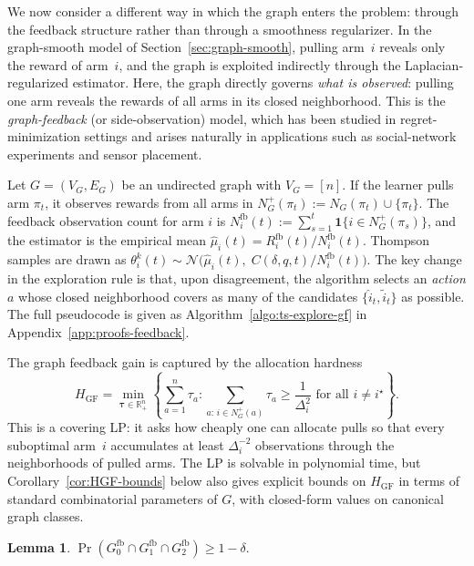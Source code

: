 \documentclass{article}
\newcommand{\ind}{\mathbf{1}}         %
\newtheorem{lemma}[theorem]{Lemma}
\begin{document}
We now consider a different way in which the graph enters the problem: through the feedback structure rather than through a smoothness regularizer.
In the graph-smooth model of Section~\ref{sec:graph-smooth}, pulling arm~$i$ reveals only the reward of arm~$i$, and the graph is exploited indirectly through the Laplacian-regularized estimator.
Here, the graph directly governs \emph{what is observed}: pulling one arm reveals the rewards of all arms in its closed neighborhood. This is the \emph{graph-feedback} (or side-observation) model, which has been studied in regret-minimization settings \citep{atsidakou2022asymptotically, wu2015online} and arises naturally in applications such as social-network experiments and sensor placement.

Let $G=(V_G,E_G)$ be an undirected graph with $V_G=[n]$. If the learner pulls arm $\pi_t$, it observes rewards from all arms in $N_G^+(\pi_t) := N_G(\pi_t) \cup \{\pi_t\}$. The feedback observation count for arm $i$ is $N_i^{\mathrm{fb}}(t) := \sum_{s=1}^t \ind\{i\in N_G^+(\pi_s)\}$, and the estimator is the empirical mean $\widehat\mu_i(t) = R_i^{\mathrm{fb}}(t)/N_i^{\mathrm{fb}}(t)$. Thompson samples are drawn as $\theta_i^k(t)\sim \mathcal N\bigl(\widehat\mu_i(t),\;C(\delta,q,t)/N_i^{\mathrm{fb}}(t)\bigr)$. The key change in the exploration rule is that, upon disagreement, the algorithm selects an \emph{action} $a$ whose closed neighborhood covers as many of the candidates $\{\widehat i_t, \widetilde i_t\}$ as possible. The full pseudocode is given as Algorithm~\ref{algo:ts-explore-gf} in Appendix~\ref{app:proofs-feedback}.

The graph feedback gain is captured by the allocation hardness
\begin{equation}
H_{\mathrm{GF}}
=
\min_{\bm\tau\in\mathbb R_+^n}
\left\{
\sum_{a=1}^n \tau_a:
\sum_{a:\,i\in N_G^+(a)}\tau_a\ge \frac{1}{\Delta_i^2}
\text{ for all }i\neq i^\star
\right\}.
\label{eq:HGF}
\end{equation}
This is a covering LP: it asks how cheaply one can allocate pulls so that every suboptimal arm~$i$ accumulates at least $\Delta_i^{-2}$ observations through the neighborhoods of pulled arms. The LP is solvable in polynomial time, but Corollary~\ref{cor:HGF-bounds} below also gives explicit bounds on $H_{\mathrm{GF}}$ in terms of standard combinatorial parameters of $G$, with closed-form values on canonical graph classes.

\begin{lemma}\label{lem:good-fb}
$\Pr(G_0^{\mathrm{fb}}\cap G_1^{\mathrm{fb}}\cap G_2^{\mathrm{fb}})\ge 1-\delta.$
\end{lemma}
\end{document}
